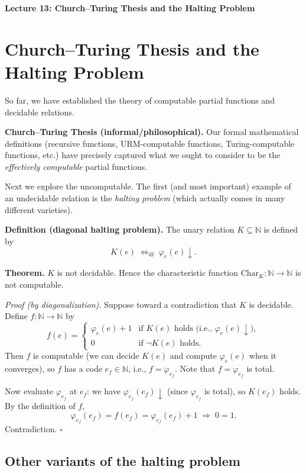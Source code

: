 \documentclass[11pt]{article}
\begin{document}
\newpage
{\LARGE\bfseries Lecture 13: Church--Turing Thesis and the Halting Problem}

\section{Church--Turing Thesis and the Halting Problem}

So far, we have established the theory of computable partial functions and decidable relations.

\textbf{Church--Turing Thesis (informal/philosophical).} Our formal mathematical definitions (recursive functions, URM-computable functions, Turing-computable functions, etc.) have precisely captured what we ought to consider to be the \emph{effectively computable} partial functions.

Next we explore the uncomputable. The first (and most important) example of an undecidable relation is the \emph{halting problem} (which actually comes in many different varieties).

\textbf{Definition (diagonal halting problem).} The unary relation $K \subseteq \mathbb{N}$ is defined by
\[
    K(e) \;\Leftrightarrow_{\mathrm{df}}\; \varphi_e(e)\downarrow.
\]

\textbf{Theorem.} $K$ is not decidable. Hence the characteristic function $\mathrm{Char}_K\colon \mathbb{N} \to \mathbb{N}$ is not computable.

\textit{Proof (by diagonalization).} Suppose toward a contradiction that $K$ is decidable. Define $f\colon \mathbb{N} \to \mathbb{N}$ by
\[
    f(e) = \begin{cases}
        \varphi_e(e) + 1 & \text{if } K(e) \text{ holds (i.e., } \varphi_e(e)\downarrow\text{)}, \\
        0 & \text{if } \neg K(e) \text{ holds}.
    \end{cases}
\]
Then $f$ is computable (we can decide $K(e)$ and compute $\varphi_e(e)$ when it converges), so $f$ has a code $e_f \in \mathbb{N}$, i.e., $f = \varphi_{e_f}$. Note that $f = \varphi_{e_f}$ is total.

Now evaluate $\varphi_{e_f}$ at $e_f$: we have $\varphi_{e_f}(e_f)\downarrow$ (since $\varphi_{e_f}$ is total), so $K(e_f)$ holds. By the definition of $f$,
\[
    \varphi_{e_f}(e_f) = f(e_f) = \varphi_{e_f}(e_f) + 1 \;\Rightarrow\; 0 = 1.
\]
Contradiction. \hfill$\square$

\subsection{Other variants of the halting problem}
\end{document}
